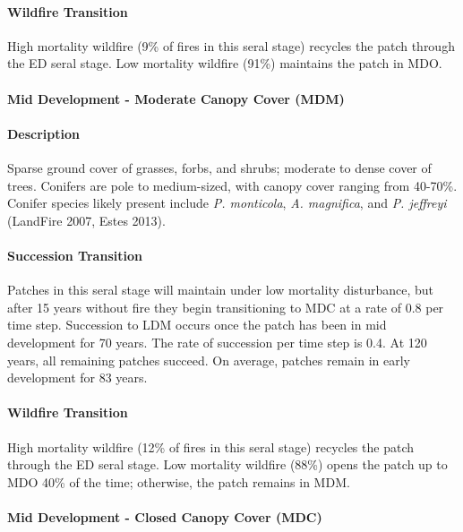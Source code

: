 \paragraph{Wildfire Transition} High mortality wildfire (9\% of fires in this seral stage) recycles the patch through the ED seral stage. Low mortality wildfire (91\%) maintains the patch in MDO.

\noindent\hrulefill

\paragraph{Mid Development - Moderate Canopy Cover (MDM)}

\paragraph{Description} Sparse ground cover of grasses, forbs, and shrubs; moderate to dense cover of trees. Conifers are pole to medium-sized, with canopy cover ranging from 40-70\%. Conifer species likely present include \emph{P. monticola}, \emph{A. magnifica}, and \emph{P. jeffreyi} (LandFire 2007, Estes 2013).

\paragraph{Succession Transition} Patches in this seral stage will maintain under low mortality disturbance, but after 15 years without fire they begin transitioning to MDC at a rate of 0.8 per time step. Succession to LDM occurs once the patch has been in mid development for 70 years. The rate of succession per time step is 0.4. At 120 years, all remaining patches succeed. On average, patches remain in early development for 83 years.

\paragraph{Wildfire Transition} High mortality wildfire (12\% of fires in this seral stage) recycles the patch through the ED seral stage. Low mortality wildfire (88\%) opens the patch up to MDO 40\% of the time; otherwise, the patch remains in MDM.

\noindent\hrulefill

\paragraph{Mid Development - Closed Canopy Cover (MDC)}

